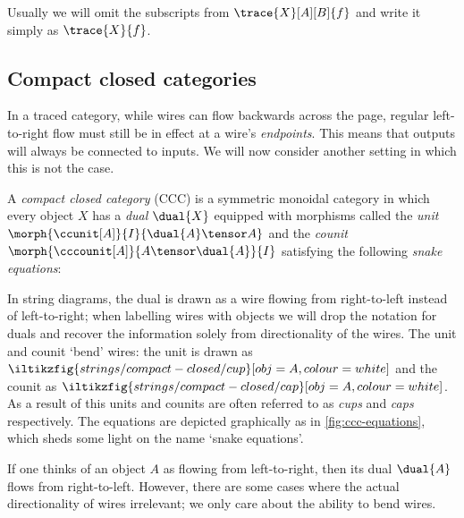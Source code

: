 Usually we will omit the subscripts from \(\trace{X}[A][B]{f}\) and write it
simply as \(\trace{X}{f}\).



\subsection{Compact closed categories}

In a traced category, while wires can flow backwards across the page, regular
left-to-right flow must still be in effect at a wire's \emph{endpoints}.
This means that outputs will always be connected to inputs.
We will now consider another setting in which this is not the case.

\begin{definition}
    A \emph{compact closed category} (CCC) is a symmetric monoidal category in
    which every object \(X\) has a \emph{dual} \(\dual{X}\) equipped with
    morphisms called the \emph{unit} \(
        \morph{\ccunit[A]}{I}{\dual{A} \tensor A}
    \) and the \emph{counit} \(
        \morph{\cccounit[A]}{A \tensor \dual{A}}{I}
    \) satisfying the following \emph{snake equations}:
    \begin{center}
        
        \quad
        
    \end{center}
\end{definition}

In string diagrams, the dual is drawn as a wire flowing from right-to-left
instead of left-to-right; when labelling wires with objects we will drop the
notation for duals and recover the information solely from directionality of the
wires.
The unit and counit `bend' wires: the unit is drawn as \(
    \iltikzfig{strings/compact-closed/cup}[obj=A,colour=white]
\) and the counit as \(
    \iltikzfig{strings/compact-closed/cap}[obj=A,colour=white]
\).
As a result of this units and counits are often referred to as \emph{cups} and
\emph{caps} respectively.
The equations are depicted graphically as in \cref{fig:ccc-equations}, which
sheds some light on the name `snake equations'.



If one thinks of an object \(A\) as flowing from left-to-right, then its dual
\(\dual{A}\) flows from right-to-left.
However, there are some cases where the actual directionality of wires
irrelevant; we only care about the ability to bend wires.

